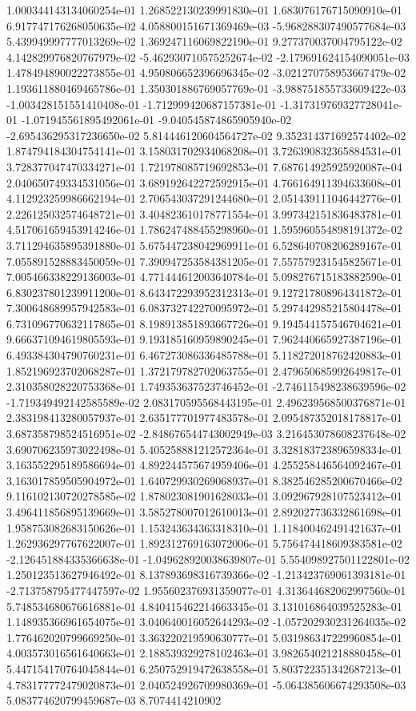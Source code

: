 	1.000344143134060254e-01	1.268522130239991830e-01	1.683076176715090910e-01	6.917747176268050635e-02	4.058800151671369469e-03	-5.968288307490577684e-03	5.439949997777013269e-02	1.369247116069822190e-01	9.277370037004795122e-02	4.142829976820767979e-02	-5.462930710575252674e-02	-2.179691624154090051e-03	1.478494890022273855e-01	4.950806652396696345e-02	-3.021270758953667479e-02	1.193611880469465786e-01	1.350301886769057769e-01	-3.988751855733609422e-03	-1.003428151551410408e-01	-1.712999420687157381e-01	-1.317319769327728041e-01	-1.071945561895492061e-01	-9.040545874865905940e-02	-2.695436295317236650e-02	5.814446120604564727e-02	9.352314371692574402e-02	1.874794184304754141e-01	3.158031702934068208e-01	3.726390832365884531e-01	3.728377047470334271e-01	1.721978085719692853e-01	7.687614925925920087e-04	2.040650749334531056e-01	3.689192642272592915e-01	4.766164911394633608e-01	4.112923259986662194e-01	2.706543037291244680e-01	2.051439111046442776e-01	2.226125032574648721e-01	3.404823610178771554e-01	3.997342151836483781e-01	4.517061659453914246e-01	1.786247488455298960e-01	1.595960554898191372e-02	3.711294635895391880e-01	5.675447238042969911e-01	6.528640708206289167e-01	7.055891528883450059e-01	7.390947253584381205e-01	7.557579231545825671e-01	7.005466338229136003e-01	4.771444612003640784e-01	5.098276715183882590e-01	6.830237801239911200e-01	8.643472293952312313e-01	9.127217808964341872e-01	7.300648689957942583e-01	6.083732742270095972e-01	5.297442985215804478e-01	6.731096770632117865e-01	8.198913851893667726e-01	9.194544157546704621e-01	9.666371094619805593e-01	9.193185160959890245e-01	7.962440665927387196e-01	6.493384304790760231e-01	6.467273086336485788e-01	5.118272018762420883e-01	1.852196923702068287e-01	1.372179782702063755e-01	2.479650685992649817e-01	2.310358028220753368e-01	1.749353637523746452e-01	-2.746115498238639596e-02	-1.719349492142585589e-02	2.083170595568443195e-01	2.496239568500376871e-01	2.383198413280057937e-01	2.635177701977483578e-01	2.095487352018178817e-01	3.687358798524516951e-02	-2.848676544743002949e-03	3.216453078608237648e-02	3.690706235973022498e-01	5.405258881212572364e-01	3.328183723896598334e-01	3.163552295189586694e-01	4.892244575674959406e-01	4.255258446564092467e-01	3.163017859505904972e-01	1.640729930269068937e-01	8.382546285200670466e-02	9.116102130720278585e-02	1.878023081901628033e-01	3.092967928107523412e-01	3.496411856895139669e-01	3.585278007012610013e-01	2.892027736332861698e-01	1.958753082683150626e-01	1.153243634363318310e-01	1.118400462491421637e-01	1.262936297767622007e-01	1.892312769163072006e-01	5.756474418609383581e-02	-2.126451884335366638e-01	-1.049628920038639807e-01	5.554098927501122801e-02	1.250123513627946492e-01	8.137893698316739366e-02	-1.213423769061393181e-01	-2.713758795477447597e-02	1.955602376931359077e-01	4.313644682062997560e-01	5.748534680676616881e-01	4.840415462214663345e-01	3.131016864039525283e-01	1.148935366961654075e-01	3.040640016052644293e-02	-1.057202930231264035e-02	1.776462020799669250e-01	3.363220219590630777e-01	5.031986347229960854e-01	4.003573016561640663e-01	2.188539329278102463e-01	3.982654021218880458e-01	5.447154170764045844e-01	6.250752919472638558e-01	5.803722351342687213e-01	4.783177772479020873e-01	2.040524926709980369e-01	-5.064385606674293508e-03	5.083774620799459687e-03	8.7074414210902